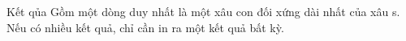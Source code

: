 Kết qủa  
Gồm một dòng duy nhất là một xâu con đối xứng dài nhất của xâu s. Nếu có nhiều kết quả, chỉ cần in ra một kết quả bất kỳ.